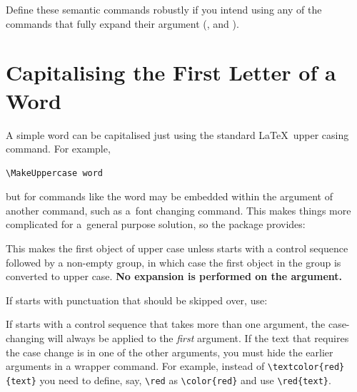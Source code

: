 \documentclass[report]{nlctdoc}
\begin{document}
Define these semantic commands robustly if you intend using
any of the commands that fully expand their argument
(,  and
).

\chapter{Capitalising the First Letter of a Word}
\label{sec:makefirstuc}

A simple word can be capitalised just using the standard \LaTeX\
upper casing command. For example,
\begin{verbatim}
\MakeUppercase word
\end{verbatim}
but for commands like  the word may be embedded within the
argument of another command, such as a~font changing command. This
makes things more complicated for a~general purpose solution, so
the \styfmt{mfirstuc} package provides:
\begin{definition}[\DescribeMacro{\makefirstuc}]
\end{definition}
This makes the first object of
 upper case unless  starts with a control
sequence followed by a non-empty group, in which case the first
object in the group is converted to upper case.
\textbf{No expansion is performed on the argument.}

If  starts with punctuation that should be skipped over,
use:
\begin{definition}[\DescribeMacro\MFUskippunc]
\end{definition}

\begin{important}
If  starts with a control sequence that takes more than
one argument, the case-changing will always be applied to the
\emph{first} argument. If the text that requires the case change is
in one of the other arguments, you must hide the earlier arguments
in a wrapper command. For example, instead of \verb|\textcolor{red}{text}|
you need to define, say, \verb|\red| as \verb|\color{red}| and use
\verb|\red{text}|.
\end{important}
\end{document}
